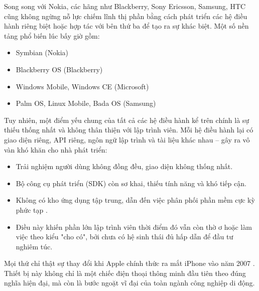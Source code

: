   \begin{flushleft}
  \hspace*{0.8cm}Song song với Nokia, các hãng như Blackberry, Sony Ericsson, Samsung, HTC cũng không ngừng nỗ lực chiếm lĩnh thị phần bằng cách phát triển các hệ điều hành riêng biệt hoặc hợp tác với bên thứ ba để tạo ra sự khác biệt. Một số nền tảng phổ biến lúc bấy giờ gồm:
  \begin{itemize}
  \item Symbian (Nokia)
  \item Blackberry OS (Blackberry)
  \item Windows Mobile, Windows CE (Microsoft)
  \item Palm OS, Linux Mobile, Bada OS (Samsung) \cite{mobile-os-pre2010}
  \end{itemize}
  \end{flushleft}
  
  \begin{flushleft}
  \hspace*{0.8cm}Tuy nhiên, một điểm yếu chung của tất cả các hệ điều hành kể trên chính là sự thiếu thống nhất và không thân thiện với lập trình viên. Mỗi hệ điều hành lại có giao diện riêng, API riêng, ngôn ngữ lập trình và tài liệu khác nhau – gây ra vô vàn khó khăn cho nhà phát triển:
  \begin{itemize}
  \item Trải nghiệm người dùng không đồng đều, giao diện không thống nhất.
  \item Bộ công cụ phát triển (SDK) còn sơ khai, thiếu tính năng và khó tiếp cận.
  \item Không có kho ứng dụng tập trung, dẫn đến việc phân phối phần mềm cực kỳ phức tạp \cite{pre-appstore-dev}.
  \item[]Điều này khiến phần lớn lập trình viên thời điểm đó vẫn còn thờ ơ hoặc làm việc theo kiểu "cho có", bởi chưa có hệ sinh thái đủ hấp dẫn để đầu tư nghiêm túc.
  \end{itemize}
  \end{flushleft}
  
  \begin{flushleft}
  \hspace*{0.8cm}Mọi thứ chỉ thật sự thay đổi khi Apple chính thức ra mắt iPhone vào năm 2007 \cite{iphone-2007-launch}. Thiết bị này không chỉ là một chiếc điện thoại thông minh đầu tiên theo đúng nghĩa hiện đại, mà còn là bước ngoặt vĩ đại của toàn ngành công nghiệp di động.
  \end{flushleft}
  

